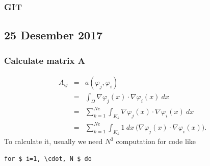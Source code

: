 \documentclass[a4paper,10pt]{article}
\begin{document}
\subsubsection{GIT}

\subsection{25 Desember 2017}

\subsubsection{Calculate matrix $ \mathbf{A}$}
\begin{eqnarray}\nonumber
A_{ij} &=& a(\varphi_{j}, \varphi_{i}) \\ \nonumber
&=& \int_{\Omega} \nabla \varphi_{j}(x) \cdot \nabla \varphi_{i}(x) \ dx \\ \nonumber
&=& \sum_{k=1}^{Ne} \int_{K_{k}} \nabla \varphi_{j}(x) \cdot \nabla \varphi_{i}(x) \ dx \\ \nonumber
&=& \sum_{k=1}^{Ne} \int_{K_{k}} 1 \ dx \ \big( \nabla \varphi_{j}(x) \cdot \nabla \varphi_{i}(x)\big).
\end{eqnarray}
To calculate it, usually we need $ N^3 $ computation for code like
\begin{lstlisting}
for $ i=1, \cdot, N $ do
\end{lstlisting}
	
\end{document}
